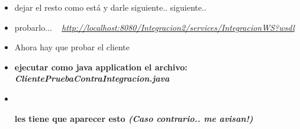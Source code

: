 \documentclass[12pt]{article}
\begin{document}
\begin{itemize}
\begin{minipage}[t]{\linewidth}
          \medskip
          \textbf{As\'i deber\'ia verse, tiene q decir \emph{Apache Axis2}!} \ \newline
          si no dice.. clic y seleccionar Axis2
    \end{minipage}
\item dejar el resto como est\'a y darle siguiente.. siguiente..
\item probarlo... \ \newline
\textit{\href{http://localhost:8080/Integracion2/services/IntegracionWS?wsdl} {http://localhost:8080/Integracion2/services/IntegracionWS?wsdl}}
\item Ahora hay que probar el cliente
\item \begin{minipage}[t]{\linewidth}
          \raggedright

          \medskip
          \textbf{ejecutar como java application el archivo: \emph{ClientePruebaContraIntegracion.java}} 
    \end{minipage}
    \item \ \newline
    \begin{minipage}[t]{\linewidth}
          \raggedright

          \medskip
          \textbf{les tiene que aparecer esto \emph{(Caso contrario.. me avisan!)}} 
    \end{minipage}
\end{itemize}
\end{document}
